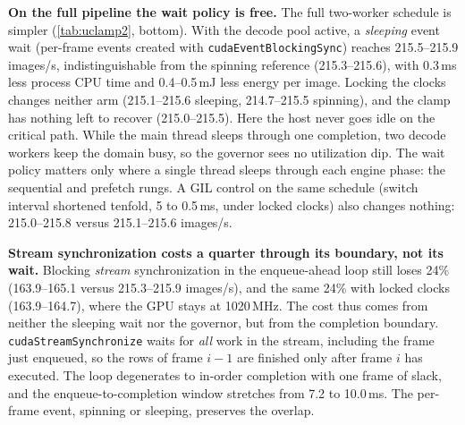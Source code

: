 \textbf{On the full pipeline the wait policy is free.}
\label{sec:waitfree}
The full two-worker schedule is simpler (\cref{tab:uclamp2}, bottom).
With the decode pool active, a \emph{sleeping} event wait (per-frame
events created with \texttt{cudaEventBlockingSync}) reaches
215.5--215.9 images/s, indistinguishable from the spinning reference
(215.3--215.6), with 0.3\,ms less process CPU time and 0.4--0.5\,mJ less
energy per image. Locking the clocks changes neither arm (215.1--215.6
sleeping, 214.7--215.5 spinning), and the clamp has nothing left to
recover (215.0--215.5). Here the host never goes idle on the critical
path. While the main thread sleeps through one completion, two decode
workers keep the domain busy, so the governor sees no utilization dip.
The wait policy matters only where a single thread sleeps through each
engine phase: the sequential and prefetch rungs. A GIL control on the
same schedule (switch interval shortened tenfold, 5 to 0.5\,ms, under
locked clocks) also changes nothing: 215.0--215.8 versus 215.1--215.6
images/s.

\textbf{Stream synchronization costs a quarter through its boundary,
not its wait.}
Blocking \emph{stream} synchronization in the enqueue-ahead loop still
loses 24\% (163.9--165.1 versus
215.3--215.9 images/s), and the same 24\% with locked clocks
(163.9--164.7), where the GPU stays at 1020\,MHz. The cost thus comes
from neither the sleeping wait nor the governor, but from the completion
boundary. \texttt{cudaStreamSynchronize} waits for \emph{all} work in
the stream, including the frame just enqueued, so the rows of frame
$i{-}1$ are finished only after frame $i$ has executed. The loop
degenerates to in-order completion with one frame of slack, and the
enqueue-to-completion window stretches from 7.2 to 10.0\,ms. The
per-frame event, spinning or sleeping, preserves the overlap.

